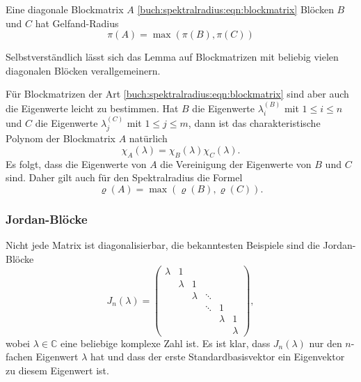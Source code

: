 \begin{lemma}
\label{buch:spektralradius:lemma:diagonalbloecke}
Eine diagonale Blockmatrix $A$ \eqref{buch:spektralradius:eqn:blockmatrix}
Blöcken $B$ und $C$  hat Gelfand-Radius
\[
\pi(A) = \max ( \pi(B), \pi(C) )
\]
\end{lemma}

Selbstverständlich lässt sich das Lemma auf Blockmatrizen mit beliebig
vielen diagonalen Blöcken verallgemeinern.
%

Für Blockmatrizen der Art \ref{buch:spektralradius:eqn:blockmatrix}
sind aber auch die Eigenwerte leicht zu bestimmen.
%
Hat $B$ die Eigenwerte $\lambda_i^{(B)}$ mit $1\le i\le n$ und $C$ die
Eigenwerte $\lambda_j^{(C)}$ mit $1\le j\le m$, dann ist das charakteristische
Polynom der Blockmatrix $A$ natürlich
%
%
\[
\chi_A(\lambda) = \chi_B(\lambda)\chi_C(\lambda).
\]
Es folgt, dass die Eigenwerte von $A$ die Vereinigung der Eigenwerte
von $B$ und $C$ sind.
Daher gilt auch für den Spektralradius die Formel
\[
\varrho(A) = \max(\varrho(B) , \varrho(C)).
\]

\subsubsection{Jordan-Blöcke}
%
Nicht jede Matrix ist diagonalisierbar, die bekanntesten Beispiele sind
die Jordan-Blöcke
\begin{equation}
J_n(\lambda)
=
\begin{pmatrix}
\lambda &      1&       &       &       &       \\
        &\lambda&      1&       &       &       \\[-5pt]
        &       &\lambda&\ddots &       &       \\[-5pt]
        &       &       &\ddots &      1&       \\
        &       &       &       &\lambda&      1\\
        &       &       &       &       &\lambda
\end{pmatrix},
\label{buch:spektralradius:eqn:jordan}
\end{equation}
wobei $\lambda\in\mathbb C$ eine beliebige komplexe Zahl ist.
Es ist klar, dass $J_n(\lambda)$ nur den $n$-fachen Eigenwert
$\lambda$ hat und dass der erste Standardbasisvektor ein
Eigenvektor zu diesem Eigenwert ist.

